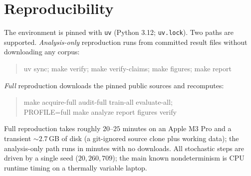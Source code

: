 \section{Reproducibility}
\label{app:repro}
The environment is pinned with \texttt{uv} (Python 3.12; \texttt{uv.lock}). Two
paths are supported. \emph{Analysis-only} reproduction runs from committed result
files without downloading any corpus:
\begin{quote}\ttfamily
uv sync; make verify; make verify-claims; make figures; make report
\end{quote}
\emph{Full} reproduction downloads the pinned public sources and recomputes:
\begin{quote}\ttfamily
make acquire-full audit-full train-all evaluate-all; \\
PROFILE=full make analyze report figures verify
\end{quote}
Full reproduction takes roughly $20$--$25$ minutes on an Apple M3 Pro and a
transient ${\sim}2.7$\,GB of disk (a git-ignored source clone plus working data);
the analysis-only path runs in minutes with no downloads. All stochastic steps are
driven by a single seed ($20{,}260{,}709$); the main known nondeterminism is CPU
runtime timing on a thermally variable laptop.
